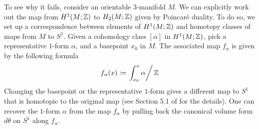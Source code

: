 To see why it fails, consider an orientable $3$-manifold $M$. We can explicitly work out the map from
$H^1(M; \mathbb{Z})$ to $H_2(M; \mathbb{Z})$ given by Poincar\'e duality.
To do so, we set up a correspondence between elements of $H^1(M; \mathbb{Z})$ and homotopy classes of maps from
$M$ to $S^1$. Given a cohomology class $[\alpha]$ in $H^1(M; \mathbb{Z})$, pick a representative $1$-form $\alpha$,
and a basepoint $x_0$ in $M$. The associated map $f_{\alpha}$ is given by the following formula
\begin{align*}
  f_{\alpha}(x) \coloneqq \left. \int_{x_0}^x \alpha \right/ \mathbb{Z}
\end{align*}
Changing the basepoint or the representative $1$-form gives a different map to $S^1$ that is homotopic to the
original map (see Section 5.1 of \cite{calegari2007foliations} for the details). One can recover the $1$-form
$\alpha$ from the map $f_{\alpha}$ by pulling back the canonical volume form $d\theta$ on $S^1$ along $f_{\alpha}$.

